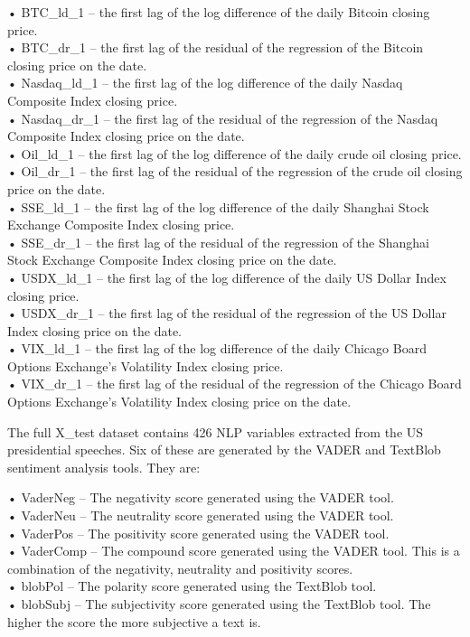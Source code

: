 \documentclass[11pt,preprint, authoryear]{elsarticle}
\numberwithin{equation}{section}
\numberwithin{figure}{section}
\numberwithin{table}{section}
\begin{document}
• BTC\_ld\_1 -- the first lag of the log difference of the daily Bitcoin
closing price.\\
• BTC\_dr\_1 -- the first lag of the residual of the regression of the
Bitcoin closing price on the date.\\
• Nasdaq\_ld\_1 -- the first lag of the log difference of the daily
Nasdaq Composite Index closing price.\\
• Nasdaq\_dr\_1 -- the first lag of the residual of the regression of
the Nasdaq Composite Index closing price on the date.\\
• Oil\_ld\_1 -- the first lag of the log difference of the daily crude
oil closing price.\\
• Oil\_dr\_1 -- the first lag of the residual of the regression of the
crude oil closing price on the date.\\
• SSE\_ld\_1 -- the first lag of the log difference of the daily
Shanghai Stock Exchange Composite Index closing price.\\
• SSE\_dr\_1 -- the first lag of the residual of the regression of the
Shanghai Stock Exchange Composite Index closing price on the date.\\
• USDX\_ld\_1 -- the first lag of the log difference of the daily US
Dollar Index closing price.\\
• USDX\_dr\_1 -- the first lag of the residual of the regression of the
US Dollar Index closing price on the date.\\
• VIX\_ld\_1 -- the first lag of the log difference of the daily Chicago
Board Options Exchange's Volatility Index closing price.\\
• VIX\_dr\_1 -- the first lag of the residual of the regression of the
Chicago Board Options Exchange's Volatility Index closing price on the
date.

The full X\_test dataset contains 426 NLP variables extracted from the
US presidential speeches. Six of these are generated by the VADER and
TextBlob sentiment analysis tools. They are:

• VaderNeg -- The negativity score generated using the VADER tool.\\
• VaderNeu -- The neutrality score generated using the VADER tool.\\
• VaderPos -- The positivity score generated using the VADER tool.\\
• VaderComp -- The compound score generated using the VADER tool. This
is a combination of the negativity, neutrality and positivity scores.\\
• blobPol -- The polarity score generated using the TextBlob tool.\\
• blobSubj -- The subjectivity score generated using the TextBlob tool.
The higher the score the more subjective a text is.
\end{document}
